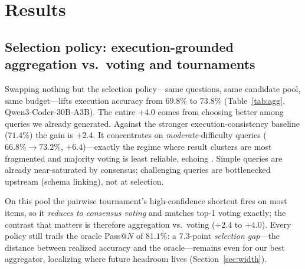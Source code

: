 \documentclass{article}
\begin{document}

\section{Results}
\label{sec:results}

\subsection{Selection policy: execution-grounded aggregation vs.\ voting and tournaments}
\label{sec:agg}

Swapping nothing but the selection policy---same questions, same candidate pool, same budget---lifts execution accuracy from $69.8\%$ to $73.8\%$ (Table~\ref{tab:agg}, Qwen3-Coder-30B-A3B). The entire $+4.0$ comes from choosing better among queries we already generated. Against the stronger execution-consistency baseline ($71.4\%$) the gain is $+2.4$. It concentrates on \emph{moderate}-difficulty queries ($66.8\%\!\rightarrow\!73.2\%$, $+6.4$)---exactly the regime where result clusters are most fragmented and majority voting is least reliable, echoing \citet{zhao2025majority}. Simple queries are already near-saturated by consensus; challenging queries are bottlenecked upstream (schema linking), not at selection.

On this pool the pairwise tournament's high-confidence shortcut fires on most items, so it \emph{reduces to consensus voting} and matches top-1 voting exactly; the contrast that matters is therefore aggregation vs.\ voting ($+2.4$ to $+4.0$). Every policy still trails the oracle Pass@$N$ of $81.1\%$: a $7.3$-point \emph{selection gap}---the distance between realized accuracy and the oracle---remains even for our best aggregator, localizing where future headroom lives (Section~\ref{sec:width}).
\end{document}
